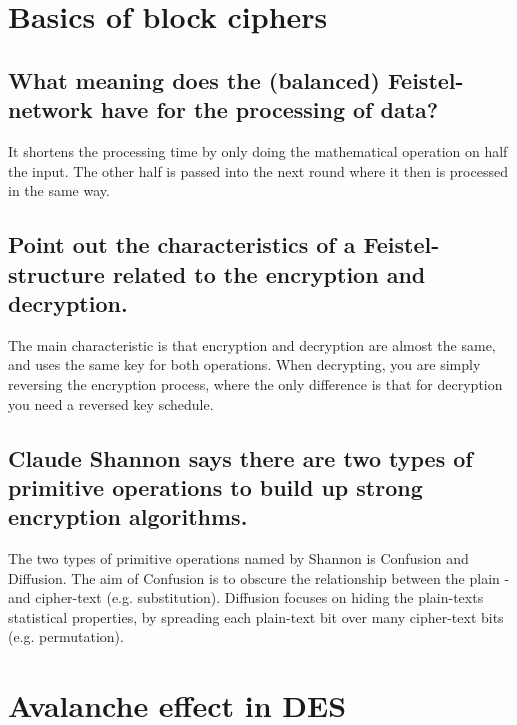 \section{Basics of block ciphers}

\subsection{What meaning does the (balanced) Feistel-network have for the processing of data?}
\label{section:2a}
It shortens the processing time by only doing the mathematical operation on half the input. 
The other half is passed into the next round where it then is processed in the same way.

\subsection{Point out the characteristics of a Feistel-structure related to the encryption and decryption.}
\label{section:2b}
The main characteristic is that encryption and decryption are almost the same, and uses the same key for both operations. 
When decrypting, you are simply reversing the encryption process, where the only difference is that for decryption you need a reversed key schedule.

\subsection{Claude Shannon says there are two types of primitive operations to build up strong encryption algorithms.}
\label{section:2c}
The two types of primitive operations named by Shannon is Confusion and Diffusion. 
The aim of Confusion is to obscure the relationship between the plain - and cipher-text (e.g. substitution).
Diffusion focuses on hiding the plain-texts statistical properties, by spreading each plain-text bit over many cipher-text bits (e.g. permutation).

\section{Avalanche effect in DES}
